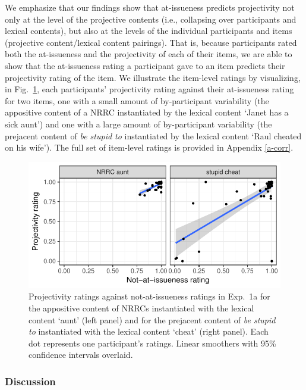 \documentclass[11pt,fleqn]{article}
\newcommand{\6}{\mbox{$[\hspace*{-.6mm}[$}}
\newcommand{\9}{\mbox{$]\hspace*{-.6mm}]$}}
\newcommand{\figref}[1]{Fig.~\ref{#1}}
\begin{document}
We emphasize that our findings show that at-issueness predicts projectivity not only at the level of the projective contents (i.e., collapsing over participants and lexical contents), but also at the levels of the individual participants and items (projective content/lexical content pairings). That is, because participants rated both the at-issueness and the projectivity of each of their items, we are able to show that the at-issueness rating a participant gave to an item predicts their projectivity rating of 
the item. We illustrate the item-level ratings by visualizing, in \figref{f-ind-corr1a}, each participants' projectivity rating against their at-issueness rating for two items, one with a small amount of by-participant variability (the appositive content of a NRRC instantiated by the lexical content `Janet has a sick aunt') and one with a large amount of by-participant variability (the prejacent content of {\em be stupid to} instantiated by the lexical content `Raul cheated on his wife'). The full set of item-level ratings is provided in Appendix \ref{a-corr}.


\begin{figure}[!h]
\begin{center}

\includegraphics[width=12cm]{../results/exp1a/graphs/subject-projai-examples}

\end{center}
\caption{Projectivity ratings against not-at-issueness ratings in Exp.~1a for the appositive content of NRRCs instantiated with the lexical content `aunt' (left panel) and for the prejacent content of {\em be stupid to} instantiated with the lexical content `cheat' (right panel). Each dot represents one participant's ratings. Linear smoothers with 95\% confidence intervals overlaid.}
\label{f-ind-corr1a}
\end{figure}

\subsubsection{Discussion}\label{s-discussion1a}
\end{document}
